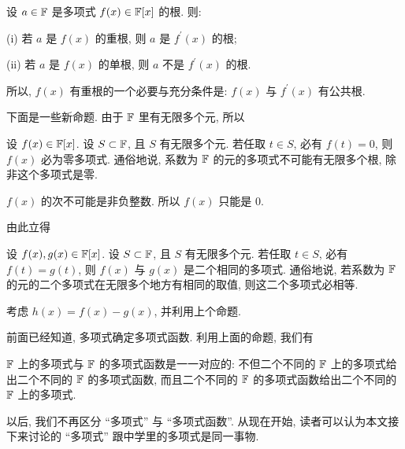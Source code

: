 \begin{proposition}
    设 $a \in \mathbb{F}$ 是多项式 $f(x) \in \mathbb{F}[x]$ 的根. 则:

    (i) 若 $a$ 是 $f(x)$ 的重根, 则 $a$ 是 $f^{\prime} (x)$ 的根;

    (ii) 若 $a$ 是 $f(x)$ 的单根, 则 $a$ 不是 $f^{\prime} (x)$ 的根.

    所以, $f(x)$ 有重根的一个必要与充分条件是: $f(x)$ 与 $f^{\prime} (x)$ 有公共根.
\end{proposition}

下面是一些新命题. 由于 $\mathbb{F}$ 里有无限多个元, 所以

\begin{proposition}
    设 $f(x) \in \mathbb{F}[x]$. 设 $S \subset \mathbb{F}$, 且 $S$ 有无限多个元. 若任取 $t \in S$, 必有 $f(t) = 0$, 则 $f(x)$ 必为零多项式. 通俗地说, 系数为 $\mathbb{F}$ 的元的多项式不可能有无限多个根, 除非这个多项式是零.
\end{proposition}

\begin{pf}
    $f(x)$ 的次不可能是非负整数. 所以 $f(x)$ 只能是 $0$.
\end{pf}

由此立得

\begin{proposition}
    设 $f(x),g(x) \in \mathbb{F}[x]$. 设 $S \subset \mathbb{F}$, 且 $S$ 有无限多个元. 若任取 $t \in S$, 必有 $f(t) = g(t)$, 则 $f(x)$ 与 $g(x)$ 是二个相同的多项式. 通俗地说, 若系数为 $\mathbb{F}$ 的元的二个多项式在无限多个地方有相同的取值, 则这二个多项式必相等.
\end{proposition}

\begin{pf}
    考虑 $h(x) = f(x) - g(x)$, 并利用上个命题.
\end{pf}

前面已经知道, 多项式确定多项式函数. 利用上面的命题, 我们有

\begin{proposition}
    $\mathbb{F}$ 上的多项式与 $\mathbb{F}$ 的多项式函数是一一对应的: 不但二个不同的 $\mathbb{F}$ 上的多项式给出二个不同的 $\mathbb{F}$ 的多项式函数, 而且二个不同的 $\mathbb{F}$ 的多项式函数给出二个不同的 $\mathbb{F}$ 上的多项式.
\end{proposition}

\begin{remark}
    以后, 我们不再区分 ``多项式'' 与 ``多项式函数''. 从现在开始, 读者可以认为本文接下来讨论的 ``多项式'' 跟中学里的多项式是同一事物.
\end{remark}
